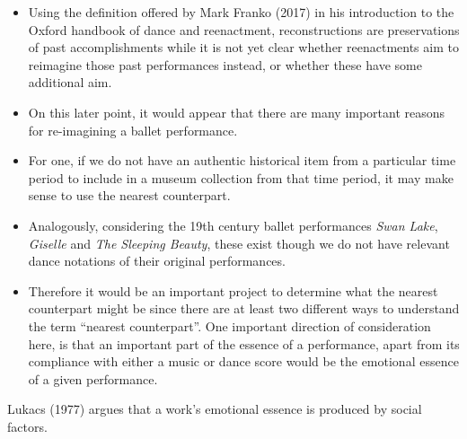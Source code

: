 \documentclass[
  letterpaper,
  DIV=11,
  numbers=noendperiod]{scrreprt}
\begin{document}
\begin{tcolorbox}[enhanced jigsaw, arc=.35mm, breakable, rightrule=.15mm, colback=white, colframe=quarto-callout-important-color-frame, bottomrule=.15mm, leftrule=.75mm, opacityback=0, toprule=.15mm, left=2mm]
\begin{tcolorbox}[enhanced jigsaw, arc=.35mm, breakable, rightrule=.15mm, colback=white, colframe=quarto-callout-tip-color-frame, bottomrule=.15mm, leftrule=.75mm, opacityback=0, toprule=.15mm, left=2mm]
\begin{itemize}
  either as being compliant with a score, or compliance with the
  original meaning of the work.
\item
  Using the definition offered by Mark Franko (2017) in his introduction
  to the Oxford handbook of dance and reenactment, reconstructions are
  preservations of past accomplishments while it is not yet clear
  whether reenactments aim to reimagine those past performances instead,
  or whether these have some additional aim.
\item
  On this later point, it would appear that there are many important
  reasons for re-imagining a ballet performance.
\item
  For one, if we do not have an authentic historical item from a
  particular time period to include in a museum collection from that
  time period, it may make sense to use the nearest counterpart.
\item
  Analogously, considering the 19th century ballet performances
  \emph{Swan Lake}, \emph{Giselle} and \emph{The Sleeping Beauty}, these
  exist though we do not have relevant dance notations of their original
  performances.
\item
  Therefore it would be an important project to determine what the
  nearest counterpart might be since there are at least two different
  ways to understand the term ``nearest counterpart''. One important
  direction of consideration here, is that an important part of the
  essence of a performance, apart from its compliance with either a
  music or dance score would be the emotional essence of a given
  performance.
\end{itemize}

Lukacs (1977) argues that a work's emotional essence is produced by
social factors.


\end{tcolorbox}
\end{tcolorbox}
\end{document}
